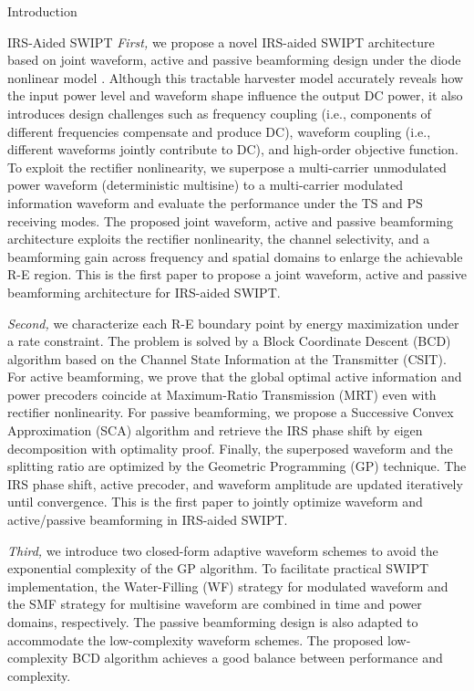 \documentclass[journal,12pt,onecolumn,draftclsnofoot]{IEEEtran}
\begin{document}
\begin{section}{Introduction}
\begin{subsection}{IRS-Aided SWIPT}
			\emph{First,} we propose a novel IRS-aided SWIPT architecture based on joint waveform, active and passive beamforming design under the diode nonlinear model \cite{Clerckx2016a}. Although this tractable harvester model accurately reveals how the input power level and waveform shape influence the output DC power, it also introduces design challenges such as frequency coupling (i.e., components of different frequencies compensate and produce DC), waveform coupling (i.e., different waveforms jointly contribute to DC), and high-order objective function. To exploit the rectifier nonlinearity, we superpose a multi-carrier unmodulated power waveform (deterministic multisine) to a multi-carrier modulated information waveform and evaluate the performance under the TS and PS receiving modes. The proposed joint waveform, active and passive beamforming architecture exploits the rectifier nonlinearity, the channel selectivity, and a beamforming gain across frequency and spatial domains to enlarge the achievable R-E region. This is the first paper to propose a joint waveform, active and passive beamforming architecture for IRS-aided SWIPT.

			\emph{Second,} we characterize each R-E boundary point by energy maximization under a rate constraint. The problem is solved by a Block Coordinate Descent (BCD) algorithm based on the Channel State Information at the Transmitter (CSIT). For active beamforming, we prove that the global optimal active information and power precoders coincide at Maximum-Ratio Transmission (MRT) even with rectifier nonlinearity. For passive beamforming, we propose a Successive Convex Approximation (SCA) algorithm and retrieve the IRS phase shift by eigen decomposition with optimality proof. Finally, the superposed waveform and the splitting ratio are optimized by the Geometric Programming (GP) technique. The IRS phase shift, active precoder, and waveform amplitude are updated iteratively until convergence. This is the first paper to jointly optimize waveform and active/passive beamforming in IRS-aided SWIPT.

			\emph{Third,} we introduce two closed-form adaptive waveform schemes to avoid the exponential complexity of the GP algorithm. To facilitate practical SWIPT implementation, the Water-Filling (WF) strategy for modulated waveform and the SMF strategy for multisine waveform are combined in time and power domains, respectively. The passive beamforming design is also adapted to accommodate the low-complexity waveform schemes. The proposed low-complexity BCD algorithm achieves a good balance between performance and complexity.


\end{subsection}
\end{section}
\end{document}

